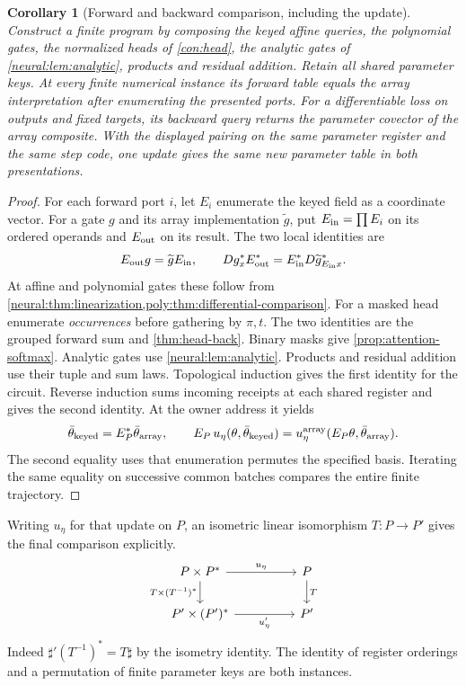 \documentclass[11pt,a4paper]{article}
\newtheorem{corollary}[corollary]{Corollary}
\theoremstyle{definition}
\theoremstyle{remark}\newaliascnt{remark}{theorem}
\numberwithin{equation}{section}
\begin{document}
\begin{corollary}[Forward and backward comparison, including the update]\label{thm:training}
Construct a finite program by composing the keyed affine queries, the polynomial gates, the normalized heads of \cref{con:head}, the analytic gates of \cref{neural:lem:analytic}, products and residual addition. Retain all shared parameter keys. At every finite numerical instance its forward table equals the array interpretation after enumerating the presented ports. For a differentiable loss on outputs and fixed targets, its backward query returns the parameter covector of the array composite. With the displayed pairing on the same parameter register and the same step code, one update gives the same new parameter table in both presentations.
\end{corollary}
\begin{proof}
For each forward port \(i\), let \(E_i\) enumerate the keyed field as a coordinate vector. For a gate \(g\) and its array implementation \(\widetilde g\), put \(E_{\rm in}=\prod E_i\) on its ordered operands and \(E_{\rm out}\) on its result. The two local identities are
\[
 E_{\rm out}g=\widetilde g E_{\rm in},\qquad
 Dg_x^* E_{\rm out}^*
       =E_{\rm in}^*D\widetilde g_{E_{\rm in}x}^* .
\]
At affine and polynomial gates these follow from \cref{neural:thm:linearization,poly:thm:differential-comparison}. For a masked head enumerate \emph{occurrences} before gathering by \(\pi,t\). The two identities are the grouped forward sum and \cref{thm:head-back}. Binary masks give \cref{prop:attention-softmax}. Analytic gates use \cref{neural:lem:analytic}. Products and residual addition use their tuple and sum laws. Topological induction gives the first identity for the circuit. Reverse induction sums incoming receipts at each shared register and gives the second identity. At the owner address it yields
\[
 \bar\theta_{\rm keyed}=E_P^*\bar\theta_{\rm array},\qquad
 E_P\,u_\eta(\theta,\bar\theta_{\rm keyed})
      =u_\eta^{\rm array}(E_P\theta,\bar\theta_{\rm array}).
\]
The second equality uses that enumeration permutes the specified basis. Iterating the same equality on successive common batches compares the entire finite trajectory.
\end{proof}
Writing \(u_\eta\) for that update on \(P\), an isometric linear isomorphism \(T:P\to P'\) gives the final comparison explicitly.
\[
\begin{tikzcd}[column sep=huge]
 P\times P^* \arrow[r,"u_\eta"]\arrow[d,"T\times (T^{-1})^*"']&P\arrow[d,"T"]\\
 P'\times(P')^*\arrow[r,"u'_\eta"'] &P'
\end{tikzcd}
\]
Indeed \(\sharp' (T^{-1})^*=T\sharp\) by the isometry identity. The identity of register orderings and a permutation of finite parameter keys are both instances.
\end{document}
